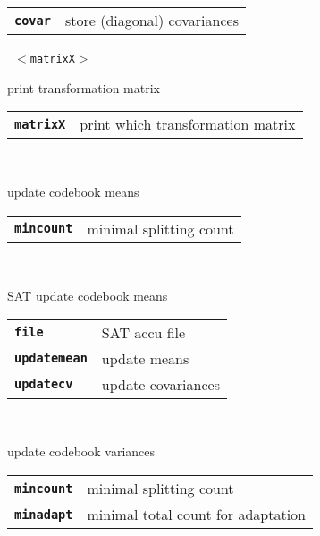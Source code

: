 \begin{description}
\begin{description}
      \begin{tabular}{ll}
 \texttt{\textbf{covar}} &  store (diagonal) covariances  \\
      \end{tabular}
       \texttt{ $<$matrixX$>$} \

        print transformation matrix

      \begin{tabular}{ll}
 \texttt{\textbf{matrixX}} &  print which transformation matrix  \\
      \end{tabular}
       \texttt{ } \

        update codebook means

      \begin{tabular}{ll}
 \texttt{\textbf{mincount}} &  minimal splitting count  \\
      \end{tabular}
       \texttt{   } \

        SAT update codebook means

      \begin{tabular}{ll}
 \texttt{\textbf{file}} &        SAT accu file  \\
 \texttt{\textbf{updatemean}} &  update means  \\
 \texttt{\textbf{updatecv}} &    update covariances  \\
      \end{tabular}
       \texttt{  } \

        update codebook variances

      \begin{tabular}{ll}
 \texttt{\textbf{mincount}} &  minimal splitting count  \\
 \texttt{\textbf{minadapt}} &  minimal total count for adaptation  \\
      \end{tabular}
    \end{description}

\end{description}

